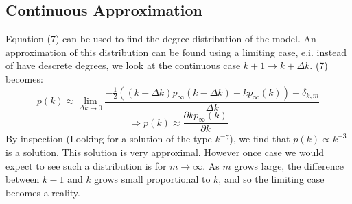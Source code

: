 \documentclass[]{article}
\begin{document}
\subsection{Continuous Approximation}
Equation (7) can be used to find the degree distribution of the model.
An approximation of this distribution can be found using a limiting case, e.i. instead of have descrete degrees, we look at the continuous case $k+1 \rightarrow k + \Delta k$. (7) becomes:
\begin{equation}
{p(k) \approx \lim\limits_{\Delta k \rightarrow 0}\frac{-\frac{1}{2}((k-\Delta k )p_{\infty}(k-\Delta k)-kp_{\infty}(k)) +\delta_{k,m}}{\Delta k} }
\end{equation}
\begin{equation}
\Rightarrow p(k)\approx \frac{\partial kp_{\infty}(k)}{\partial k}
\end{equation}
By inspection (Looking for a solution of the type $k^{-\gamma}$), we find that $p(k) \propto k^{-3}$ is a solution.  This solution is very approximal. However once case we would expect to see such a distribution is for $m \rightarrow \infty$. As $m$ grows large, the difference between $k-1$ and $k$ grows small proportional to $k$, and so the limiting case becomes a reality.
\end{document}
